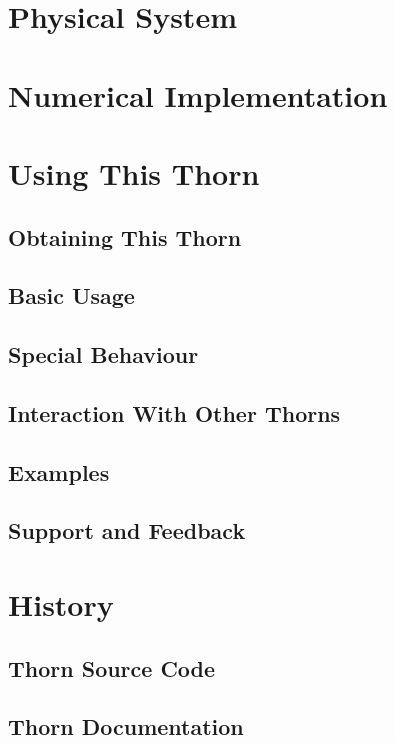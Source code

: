 \section{Physical System}

\section{Numerical Implementation}

\section{Using This Thorn}

\subsection{Obtaining This Thorn}

\subsection{Basic Usage}

\subsection{Special Behaviour}

\subsection{Interaction With Other Thorns}

\subsection{Examples}

\subsection{Support and Feedback}

\section{History}

\subsection{Thorn Source Code}

\subsection{Thorn Documentation}

